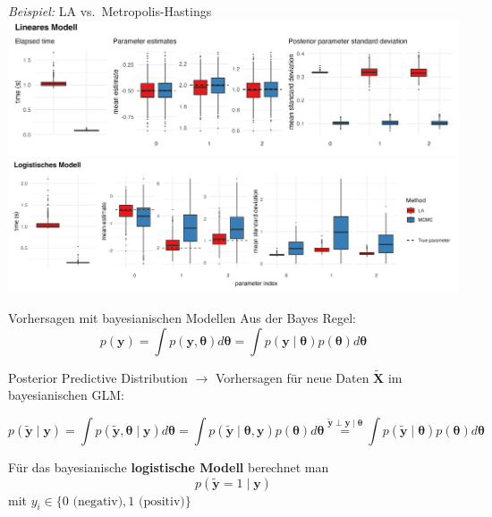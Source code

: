 \documentclass[
  ignorenonframetext,
  aspectratio=169,
]{beamer}
\newcommand{\by}{\bm{y}}
\newcommand{\btheta}{\bm{\theta}}
\newcommand{\ty}{\tilde{\bm{y}}}
\newcommand{\tX}{\tilde{\bm{X}}}
\begin{document}
\begin{frame}{\emph{Beispiel:} LA vs.~Metropolis-Hastings}
\protect{}\label{beispiel-la-vs.-metropolis-hastings}
\includegraphics[width=0.85\linewidth,height=\textheight,keepaspectratio]{../figures/approx_plot_regr.png}
\includegraphics[width=0.97\linewidth,height=\textheight,keepaspectratio]{../figures/approx_plot_class.png}
\end{frame}

\begin{frame}{Vorhersagen mit bayesianischen Modellen}
\protect{}\label{vorhersagen-mit-bayesianischen-modellen}
Aus der Bayes Regel:
\[p(\by) = \int p(\by, \btheta) d\btheta = \int p(\by \mid \btheta) p(\btheta) d\btheta\]

\begin{block}{Posterior Predictive Distribution}
\protect{}\label{posterior-predictive-distribution}
\(\to\) Vorhersagen für neue Daten \(\tX\) im bayesianischen GLM:
\autocite{box_sampling_1980,barbieri_posterior_2015}

\[
p(\ty \mid \by) = \int p(\ty, \btheta \mid \by) d \btheta 
    = \int p(\ty \mid \btheta, \by) p(\btheta) d \btheta
    \overset{\ty \perp \by \mid \btheta}{=}  \int p(\ty \mid \btheta) p(\btheta) d \btheta
\]
\end{block}

Für das bayesianische \textbf{logistische Modell} berechnet man
\[p(\ty = 1 \mid \by)\] mit
\(y_i \in \{0 \text{ (negativ)}, 1 \text{ (positiv)}\}\)
\end{frame}
\end{document}

